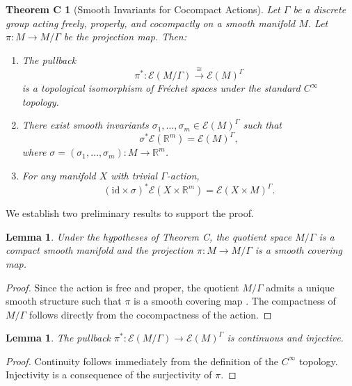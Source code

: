\documentclass[]{article}
\newtheorem*{theoremC}{Theorem C}
\newtheorem{lemma}[theorem]{Lemma}
\begin{document}
\begin{theoremC}[Smooth Invariants for Cocompact Actions]
	Let \( \Gamma \) be a discrete group acting freely, properly, and cocompactly on a smooth manifold \( M \). Let \( \pi: M \to M/\Gamma \) be the projection map.
	Then:
	\begin{enumerate}
		\item The pullback
		\[
		\pi^*: \mathcal{E}(M/\Gamma) \xrightarrow{\cong} \mathcal{E}(M)^\Gamma
		\]
		is a topological isomorphism of Fréchet spaces under the standard $ C^\infty $ topology.
		\item There exist smooth invariants \( \sigma_1, \ldots, \sigma_m \in \mathcal{E}(M)^\Gamma \) such that
		\[
		\sigma^* \mathcal{E}(\mathbb{R}^m) = \mathcal{E}(M)^\Gamma,
		\]
		where \( \sigma = (\sigma_1, \ldots, \sigma_m): M \to \mathbb{R}^m \).
		\item For any manifold \( X \) with trivial \( \Gamma \)-action,
		\[
		(\mathrm{id} \times \sigma)^* \mathcal{E}(X \times \mathbb{R}^m) = \mathcal{E}(X \times M)^\Gamma.
		\]
	\end{enumerate}
	
\end{theoremC}

	We establish two preliminary results to support the proof.
	
	\begin{lemma} \label{lem:quotient_manifold}
	Under the hypotheses of Theorem C, the quotient space \( M/\Gamma \) is a compact smooth manifold and the projection \( \pi: M \to M/\Gamma \) is a smooth covering map.
	\end{lemma}
	\begin{proof}
	Since the action is free and proper, the quotient $ M/\Gamma $ admits a unique smooth structure such that $ \pi $ is a smooth covering map \cite[Theorem 7.10]{Lee2012}. The compactness of $ M/\Gamma $ follows directly from the cocompactness of the action.
	\end{proof}
	
	\begin{lemma} \label{lem:pi_continuous}
		The pullback \( \pi^*: \mathcal{E}(M/\Gamma) \to \mathcal{E}(M)^\Gamma \) is continuous and injective.
	\end{lemma}
	\begin{proof}
		Continuity follows immediately from the definition of the \( C^\infty \) topology. Injectivity is a consequence of the surjectivity of $ \pi $.
	\end{proof}
	
\end{document}
